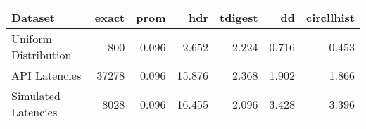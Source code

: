 \begin{tabular}{lrrrrrr}
\toprule
Dataset      &     exact &  prom &      hdr &  tdigest &    dd &  circllhist \\
\midrule
Uniform Distribution &    800 & 0.096  &   2.652 &  2.224 &  0.716 & 0.453 \\
API Latencies        &  37278 & 0.096  &  15.876 &  2.368 &  1.902 & 1.866 \\
Simulated Latencies  &   8028 & 0.096  &  16.455 &  2.096 &  3.428 & 3.396 \\
\bottomrule
\end{tabular}
